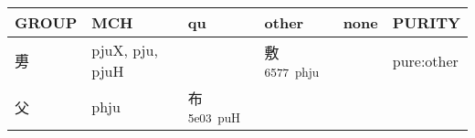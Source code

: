 \documentclass[14pt,a4paper]{scrartcl}
\begin{document}
\begin{longtable}[c]{@{}llllll@{}}
\toprule
\begin{minipage}[b]{0.14\columnwidth}\raggedright\strut
GROUP
\strut\end{minipage} &
\begin{minipage}[b]{0.14\columnwidth}\raggedright\strut
MCH
\strut\end{minipage} &
\begin{minipage}[b]{0.14\columnwidth}\raggedright\strut
qu
\strut\end{minipage} &
\begin{minipage}[b]{0.14\columnwidth}\raggedright\strut
other
\strut\end{minipage} &
\begin{minipage}[b]{0.14\columnwidth}\raggedright\strut
none
\strut\end{minipage} &
\begin{minipage}[b]{0.14\columnwidth}\raggedright\strut
PURITY
\strut\end{minipage}\tabularnewline
\midrule
\endhead
\begin{minipage}[t]{0.14\columnwidth}\raggedright\strut
旉
\strut\end{minipage} &
\begin{minipage}[t]{0.14\columnwidth}\raggedright\strut
pjuX, pju, pjuH
\strut\end{minipage} &
\begin{minipage}[t]{0.14\columnwidth}\raggedright\strut
\strut\end{minipage} &
\begin{minipage}[t]{0.14\columnwidth}\raggedright\strut
敷\textsuperscript{6577~phju}
\strut\end{minipage} &
\begin{minipage}[t]{0.14\columnwidth}\raggedright\strut
\strut\end{minipage} &
\begin{minipage}[t]{0.14\columnwidth}\raggedright\strut
pure:other
\strut\end{minipage}\tabularnewline
\begin{minipage}[t]{0.14\columnwidth}\raggedright\strut
父
\strut\end{minipage} &
\begin{minipage}[t]{0.14\columnwidth}\raggedright\strut
phju
\strut\end{minipage} &
\begin{minipage}[t]{0.14\columnwidth}\raggedright\strut
布\textsuperscript{5e03~puH}
\strut\end{minipage} &

\end{longtable}
\end{document}
